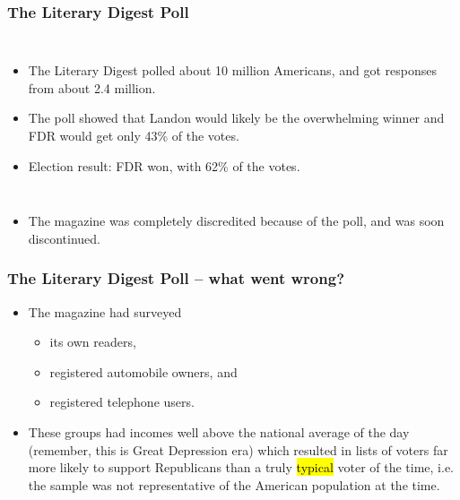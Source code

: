 \documentclass[slidestop,compress,mathserif]{beamer}
\begin{document}

\begin{frame}
	\frametitle{The Literary Digest Poll}

	\begin{columns}

		\begin{itemize}
			\item The Literary Digest polled about 10 million Americans, and got responses from about 2.4 million.
			\item The poll showed that Landon would likely be the overwhelming winner and FDR would get only 43\% of the votes.
			\item Election result:  FDR won, with 62\% of the votes.
		\end{itemize}


	\end{columns}

	\begin{itemize}
		\item The magazine was completely discredited because of the poll, and was soon discontinued.
	\end{itemize}

\end{frame}


\begin{frame}
	\frametitle{The Literary Digest Poll -- what went wrong?}

	\begin{itemize}
		\item The magazine had surveyed
		\begin{itemize}
			\item its own readers,
			\item registered automobile owners, and
			\item registered telephone users.
		\end{itemize}
		\item These groups had incomes well above the national average of the day (remember, this is Great Depression era) which resulted in lists of voters far more likely to support Republicans than a truly \hl{typical} voter of the time, i.e. the sample was not representative of the American population at the time.
	\end{itemize}

\end{frame}
\end{document}
